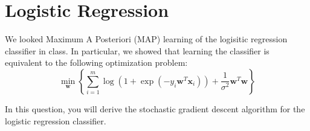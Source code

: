 \section{Logistic Regression}\label{sec:q1}

We looked Maximum A Posteriori (MAP) learning of the logisitic
regression classifier in class.  In particular, we showed that
learning the classifier is equivalent to the following optimization
problem:
\begin{equation*}
    \min_{\mathbf{w}}\left\{\sum\limits_{i=1}^m \log(1+\exp(-y_i \mathbf{w}^{T}\mathbf{x}_i))+\frac{1}{\sigma^2}\mathbf{w}^T \mathbf{w}\right\}
\end{equation*}

In this question, you will derive the stochastic gradient descent
algorithm for the logistic regression classifier. 

